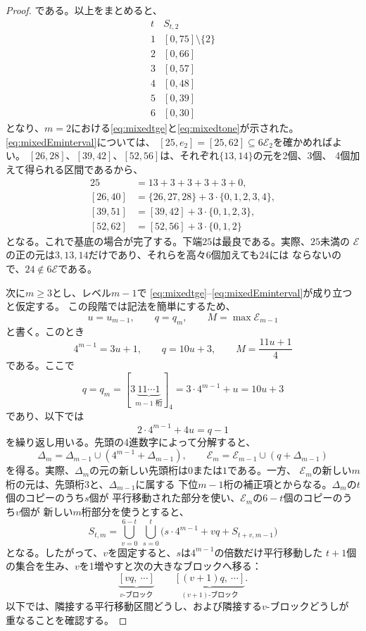 \documentclass[12pt]{ltjsarticle}
\theoremstyle{plain}
\begin{document}
\begin{proof}
である。以上をまとめると、
\[
\begin{array}{c|c}
t&S_{t,2}\\ \hline
1&[0,75]\setminus\{2\}\\
2&[0,66]\\
3&[0,57]\\
4&[0,48]\\
5&[0,39]\\
6&[0,30]
\end{array}
\]
となり、$m=2$における\eqref{eq:mixedtge}と\eqref{eq:mixedtone}が示された。
\eqref{eq:mixedEminterval}については、
$[25,e_2]=[25,62]\subseteq6\mathcal E_2$を確かめればよい。
$[26,28]$、$[39,42]$、$[52,56]$は、それぞれ$\{13,14\}$の元を2個、3個、
4個加えて得られる区間であるから、
\[
\begin{aligned}
25&=13+3+3+3+3+0,\\
[26,40]&=\{26,27,28\}+3\cdot\{0,1,2,3,4\},\\
[39,51]&=[39,42]+3\cdot\{0,1,2,3\},\\
[52,62]&=[52,56]+3\cdot\{0,1,2\}
\end{aligned}
\]
となる。これで基底の場合が完了する。下端$25$は最良である。実際、$25$未満の
$\mathcal E$の正の元は$3,13,14$だけであり、それらを高々6個加えても$24$には
ならないので、$24\notin6\mathcal E$である。

次に$m\geq3$とし、レベル$m-1$で
\eqref{eq:mixedtge}--\eqref{eq:mixedEminterval}が成り立つと仮定する。
この段階では記法を簡単にするため、
\[
 u=u_{m-1},\qquad q=q_m,
 \qquad M=\max\mathcal E_{m-1}
\]
と書く。このとき
\[
 4^{m-1}=3u+1,\qquad q=10u+3,
 \qquad M=\frac{11u+1}{4}
\]
である。ここで
\begin{equation}\label{eq:qmdef}
 q=q_m=[3\underbrace{11\cdots1}_{m-1\text{ 桁}}]_4
      =3\cdot4^{m-1}+u=10u+3
\end{equation}
であり、以下では
\begin{equation}\label{eq:qoverlap}
 2\cdot4^{m-1}+4u=q-1
\end{equation}
を繰り返し用いる。先頭の4進数字によって分解すると、
\[
 \Delta_m=\Delta_{m-1}\cup(4^{m-1}+\Delta_{m-1}),\qquad
 \mathcal E_m=\mathcal E_{m-1}\cup(q+\Delta_{m-1})
\]
を得る。実際、$\Delta_m$の元の新しい先頭桁は$0$または$1$である。一方、
$\mathcal E_m$の新しい$m$桁の元は、先頭桁$3$と、$\Delta_{m-1}$に属する
下位$m-1$桁の補正項とからなる。$\Delta_m$の$t$個のコピーのうち$s$個が
平行移動された部分を使い、$\mathcal E_m$の$6-t$個のコピーのうち$v$個が
新しい$m$桁部分を使うとすると、
\begin{equation}\label{eq:decomp}
 S_{t,m}=\bigcup_{v=0}^{6-t}\ \bigcup_{s=0}^{t}
 \bigl(s\cdot4^{m-1}+vq+S_{t+v,m-1}\bigr)
\end{equation}
となる。したがって、$v$を固定すると、$s$は$4^{m-1}$の倍数だけ平行移動した
$t+1$個の集合を生み、$v$を1増やすと次の大きなブロックへ移る：
\[
 \underbrace{[vq,\ \cdots]}_{v\text{-ブロック}}
 \qquad
 \underbrace{[(v+1)q,\ \cdots]}_{(v+1)\text{-ブロック}}.
\]
以下では、隣接する平行移動区間どうし、および隣接する$v$-ブロックどうしが
重なることを確認する。


\end{proof}
\end{document}
